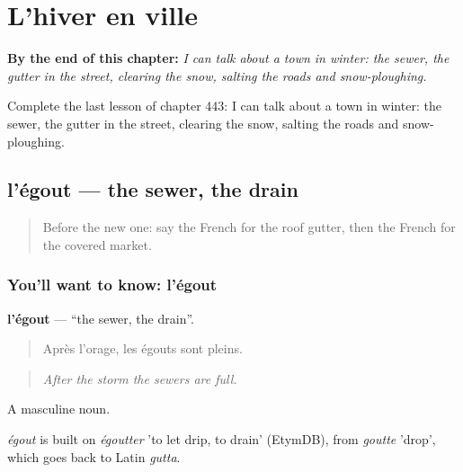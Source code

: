 
\chapter{L'hiver en ville}
\label{ch:fr-l-hiver-en-ville}

\begin{chapteropening}
\textbf{By the end of this chapter:} \emph{I can talk about a town in winter: the sewer, the gutter in the street, clearing the snow, salting the roads and snow-ploughing.}

Complete the last lesson of chapter 443: I can talk about a town in winter: the sewer, the gutter in the street, clearing the snow, salting the roads and snow-ploughing.
\end{chapteropening}

\section[l'égout]{l'égout — the sewer, the drain}

\label{lesson:FR-C443-egout}



\begin{quote}
Before the new one: say the French for the roof gutter, then the French for the covered market.
\end{quote}

\subsection*{You'll want to know: l'égout}
\textbf{l'égout} — \textquotedblleft{}the sewer, the drain\textquotedblright{}.

\begin{quote}
Après l'orage, les égouts sont pleins.
\end{quote}

\begin{quote}
\emph{After the storm the sewers are full.}
\end{quote}

A masculine noun.

\begin{cousinweb}
\emph{égout} is built on \emph{égoutter} 'to let drip, to drain' (EtymDB), from \emph{goutte} 'drop', which goes back to Latin \emph{gutta}.
\end{cousinweb}

